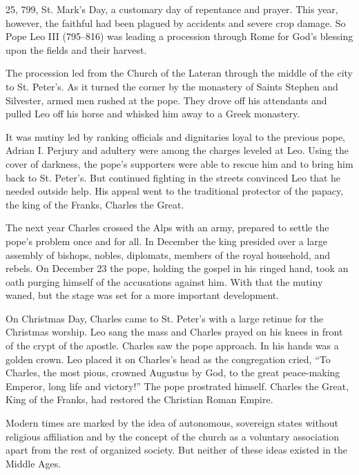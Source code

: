 
 25, 799, St. Mark’s Day, a customary day of repentance and prayer.
This year, however, the faithful had been plagued by accidents and severe crop damage. So Pope Leo
III (795–816) was leading a procession through Rome for God’s blessing upon the fields and their
harvest.

The procession led from the Church of the Lateran through the middle of the city to St. Peter’s. As
it turned the corner by the monastery of Saints Stephen and Silvester, armed men rushed at the pope.
They drove off his attendants and pulled Leo off his horse and whisked him away to a Greek
monastery.

It was mutiny led by ranking officials and dignitaries loyal to the previous pope, Adrian I. Perjury
and adultery were among the charges leveled at Leo. Using the cover of darkness, the pope’s
supporters were able to rescue him and to bring him back to St. Peter’s. But continued fighting in
the streets convinced Leo that he needed outside help. His appeal went to the traditional protector
of the papacy, the king of the Franks, Charles the Great.

The next year Charles crossed the Alps with an army, prepared to settle the pope’s problem once and
for all. In December the king presided over a large assembly of bishops, nobles, diplomats, members
of the royal household, and rebels. On December 23 the pope, holding the gospel in his ringed hand,
took an oath purging himself of the accusations against him. With that the mutiny waned, but the
stage was set for a more important development.

On Christmas Day, Charles came to St. Peter’s with a large retinue for the Christmas worship. Leo
sang the mass and Charles prayed on his knees in front of the crypt of the apostle. Charles saw the
pope approach. In his hands was a golden crown. Leo placed it on Charles’s head as the congregation
cried, “To Charles, the most pious, crowned Augustus by God, to the great peace-making Emperor, long
life and victory!” The pope prostrated himself. Charles the Great, King of the Franks, had restored
the Christian Roman Empire.

Modern times are marked by the idea of autonomous, sovereign states without religious affiliation
and by the concept of the church as a voluntary association apart from the rest of organized
society. But neither of these ideas existed in the Middle Ages.

